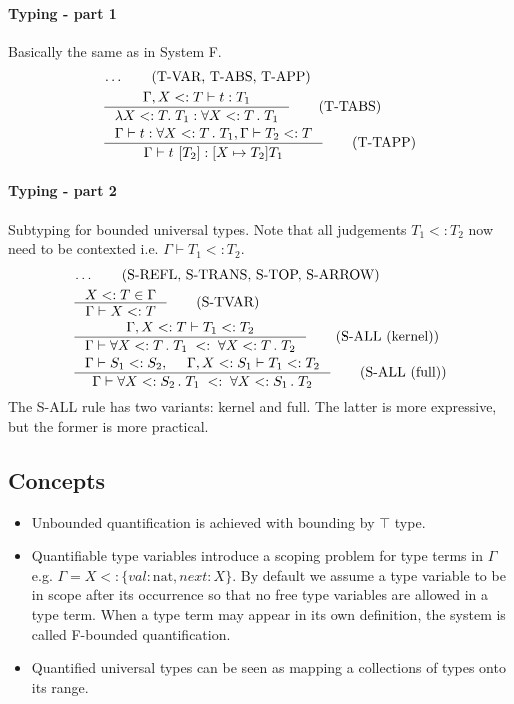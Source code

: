 \documentclass{article}
\newcommand{\lam}[2]{\lambda #1 .\;#2}
\newcommand{\tapp}[2]{#1\, \left[#2\right]}
\newcommand{\uquant}[2]{\forall #1 \, .\; #2}
\begin{document}
\paragraph{Typing - part 1}
  Basically the same as in System F.
  \begin{align*}
    & \ldots \tag{T-VAR, T-ABS, T-APP} \\
    & \inference
      {\Gamma, X<:T\vdash t : T_1}
      {\lam{X<:T}{T_1} : \uquant{X<:T}{T_1}}
      \tag{T-TABS}\\
    & \inference
      {\Gamma\vdash t : \uquant{X<:T}{T_1}, \Gamma \vdash T_2 <: T}
      {\Gamma\vdash \tapp{t}{T_2} : [X\mapsto T_2] T_1}
      \tag{T-TAPP} \\
  \end{align*}

\paragraph{Typing - part 2}
  Subtyping for bounded universal types.
  Note that all judgements $T_1 <: T_2$ now need to be contexted i.e. $\Gamma\vdash T_1 <: T_2$.
  \begin{align*}
    & \ldots \tag{S-REFL, S-TRANS, S-TOP, S-ARROW} \\
    & \inference{X <: T \in \Gamma}{\Gamma\vdash X <: T}
      \tag{S-TVAR} \\
    & \inference
      {\Gamma, X<:T \vdash T_1 <: T_2}
      {\Gamma\vdash \uquant{X<:T}{T_1}\; <: \;\uquant{X<:T}{T_2}}
      \tag{S-ALL (kernel)} \\
    & \inference
      {\Gamma \vdash S_1 <: S_2, & \Gamma, X <: S_1 \vdash T_1 <: T_2}
      {\Gamma\vdash \uquant{X<:S_2}{T_1} \;<:\; \uquant{X<:S_1}{T_2}}
      \tag{S-ALL (full)} \\
  \end{align*}
  The S-ALL rule has two variants: kernel and full.
  The latter is more expressive, but the former is more practical.

\subsection{Concepts}
  \begin{itemize}
    \item Unbounded quantification is achieved with bounding by $\top$ type.
    \item Quantifiable type variables introduce a scoping problem for type terms in $\Gamma$ e.g. $\Gamma = X <: \{val : \mathrm{nat}, next : X\}$. By default we assume a type variable to be in scope after its occurrence so that no free type variables are allowed in a type term. When a type term may appear in its own definition, the system is called F-bounded quantification.
    \item Quantified universal types can be seen as mapping a collections of types onto its range.
  \end{itemize}
\end{document}
